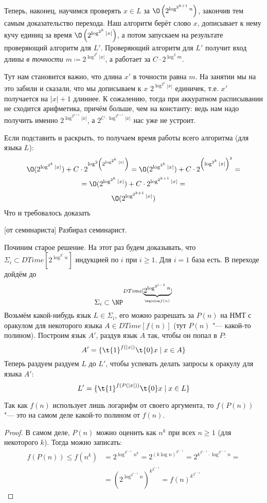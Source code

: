 	Теперь, наконец, научимся проверять $x \in L$ за $\O\left(2^{\log^{2^{k+1}} n}\right)$, закончив тем самым доказательство перехода.
	Наш алгоритм берёт слово $x$, дописывает к нему кучу единиц за время $\O\left(2^{\log^{2^k} |x|}\right)$,
	а потом запускаем на результате проверяющий алгоритм для $L'$.
	Проверяющий алгоритм для $L'$ получит вход длины \textit{в точности} $m \coloneq 2^{\log^{2^k} |x|}$, а работает
	за $C \cdot 2^{\log^2 m}$.
	\begin{Rem}
		Тут нам становится важно, что длина $x'$ в точности равна $m$.
		На занятии мы на это забили и сказали, что мы дописываем к $x$
		$2^{\log^{2^k} |x|}$ единичек, т.е. $x'$ получается на $|x|+1$ длиннее.
		К сожалению, тогда при аккуратном расписывании не сходится арифметика, причём больше, чем на константу:
		ведь нам надо получить именно $2^{\log^{2^{k+1}} |x|}$, а $2^{C\cdot \log^{2^{k+1}} |x|}$ нас уже не устроит.
	\end{Rem}
	Если подставить и раскрыть, то получаем время работы всего алгоритма (для языка $L$):
	\begin{gather*}
		\O(2^{\log^{2^k} |x|}) + C \cdot 2^{\log^2 \left(2^{\log^{2^k} |x|} \right)} =
		\O(2^{\log^{2^k} |x|}) + C \cdot 2^{\left(\log^{2^k} |x|\right)^2} = \\
		= \O(2^{\log^{2^k} |x|}) + C \cdot 2^{\log^{2^{k+1}} |x|} = \\
		\O(2^{\log^{2^{k+1}} |x|})
	\end{gather*}
	Что и требовалось доказать

[от семинариста]
	Разбирал семинарист.

	Починим старое решение.
	На этот раз будем доказывать, что $\Sigma_i \subset DTime[2^{\log^{3^i} n}]$ индукцией по $i$ при $i\ge 1$.
	Для $i = 1$ база есть.
	В переходе дойдём до
	\[ \Sigma_i \subset \NP^{DTime[\underbrace{2^{\log^{3^{i-1}} n}}_{\eqcolon f(n)}]} \]
	Возьмём какой-нибудь язык $L\in\Sigma_i$, его можно разрешать за $P(n)$ на НМТ
	с оракулом для некоторого языка $A \in DTime[f(n)]$ (тут $P(n)$ "--- какой-то полином).
	Построим язык $A'$, раздув язык $A$ так, чтобы он попал в $P$:
	\[ A' = \{ \t{1}^{f(|x|)}\t{0}x \mid x \in A \} \]
	Теперь раздуем раздуем $L$ до $L'$, чтобы успевать делать запросы к оракулу для языка $A'$:
	\[
		L' = \{ \t{1}^{f(P(|x|))}\t{0} x \mid x \in L \}
	\]
	\begin{assertion}
		Так как $f(n)$ использует лишь логарифм от своего аргумента, то $f(P(n))$ "--- это на
		самом деле какой-то полином от $f(n)$.
	\end{assertion}
	\begin{proof}
		В самом деле, $P(n)$ можно оценить как $n^k$ при всех $n \ge 1$ (для некоторого $k$).
		Тогда можно записать:
		\begin{align*}
			f(P(n)) \le
			f(n^k) &=
				2^{\log^{3^{i-1}} n^k} =
				2^{(k\log n)^{3^{i-1}}} =
				2^{k^{3^{i-1}} \cdot \log^{3^{i-1}} n} = \\
				&= \left(2^{\log^{3^{i-1}} n}\right)^{k^{3^{i-1}}} =
				f(n)^{k^{3^{i-1}}}
		\end{align*}
	\end{proof}

